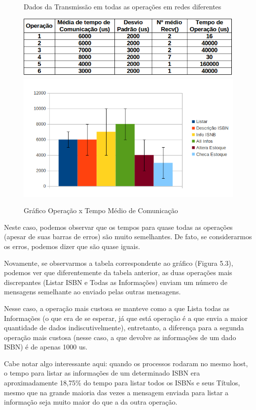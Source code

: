 \documentclass[10pt,a4paper]{report}
\begin{document}
\begin{figure}[h!]
\caption{Dados da Transmissão em todas as operações em redes diferentes}
\includegraphics[width=\textwidth]{Imagens/t02.png}
\includegraphics[width=\textwidth]{Imagens/g02.png}
\caption{Gráfico Operação x Tempo Médio de Comunicação}
\end{figure}

Neste caso, podemos observar que os tempos para quase todas as operações (apesar de suas barras de erros) são muito semelhantes. De fato, se considerarmos os erros, podemos dizer que são quase iguais.

	Novamente, se observarmos a tabela correspondente ao gráfico (Figura 5.3), podemos ver que diferentemente da tabela anterior, as duas operações mais discrepantes (Listar ISBN e Todas as Informações) enviam um número de mensagens semelhante ao enviado pelas outras mensagens.
	
	Nesse caso, a operação mais custosa se manteve como a que Lista todas as Informações (o que era de se esperar, já que está operação é a que envia a maior quantidade de dados indiscutivelmente), entretanto, a diferença para a segunda operação mais custosa (nesse caso, a que devolve as informações de um dado ISBN) é de apenas 1000 us.
	
	Cabe notar algo interessante aqui: quando os processos rodaram no mesmo host, o tempo para listar as informações de um determinado ISBN era aproximadamente 18,75\% do tempo para listar todos os ISBNs e seus Títulos, mesmo que na grande maioria das vezes a mensagem enviada para listar a informação seja muito maior do que a da outra operação.
	
\end{document}
